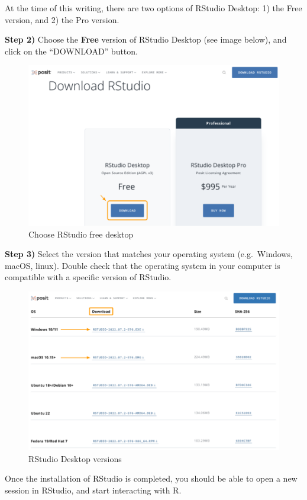 \documentclass[
]{book}
\begin{document}
At the time of this writing, there are two options of RStudio Desktop: 1) the
Free version, and 2) the Pro version.

\textbf{Step 2)} Choose the \textbf{Free} version of RStudio Desktop (see image below),
and click on the ``DOWNLOAD'' button.

\begin{figure}

{\centering \includegraphics[width=0.7\linewidth]{images/install/posit-rstudio-free} 

}

\caption{Choose RStudio free desktop}\label{fig:unnamed-chunk-13}
\end{figure}

\textbf{Step 3)} Select the version that matches your operating system (e.g.~Windows,
macOS, linux). Double check that the operating system in your computer
is compatible with a specific version of RStudio.

\begin{figure}

{\centering \includegraphics[width=0.7\linewidth]{images/install/posit-rstudio-versions} 

}

\caption{RStudio Desktop versions}\label{fig:unnamed-chunk-14}
\end{figure}

Once the installation of RStudio is completed, you should be able to open a new
session in RStudio, and start interacting with R.
\end{document}

